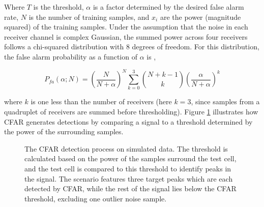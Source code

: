 Where $T$ is the threshold, $\alpha$ is a factor determined by the desired false alarm rate, $N$ is 
the number of training samples, and $x_i$ are the power (magnitude squared) of the training samples. 
Under the assumption that the noise in each receiver channel is complex Gaussian, the summed
power across four receivers follows a chi-squared distribution with 8 degrees of freedom.
For this distribution, the false alarm probability as a function of $\alpha$ is \cite{Richards2010},

\begin{equation}
    \label{eqn:cfar_false_alarm}
    P_{fa}(\alpha;N) = \left( \frac{N}{N+\alpha} \right)^N
    \sum_{k=0}^{3} \binom{N+k-1}{k}
    \left( \frac{\alpha}{N+\alpha} \right)^k
\end{equation}

where $k$ is one less than the number of receivers (here $k=3$, since samples from
a quadruplet of receivers are summed before thresholding). 
Figure \ref{fig:cfar_detection} illustrates how CFAR generates detections by comparing a signal to a 
threshold determined by the power of the surrounding samples.

\begin{figure}
    \caption[CFAR detection process.]{The CFAR detection process on simulated data. 
    The threshold is calculated based on 
    the power of the samples surround the test cell, and the test cell is compared to this threshold 
    to identify peaks in the signal. The scenario features three target peaks which are each detected 
    by CFAR, while the rest of the signal lies below the CFAR threshold, excluding one outlier noise 
    sample.}
    \label{fig:cfar_detection}    
\end{figure}
